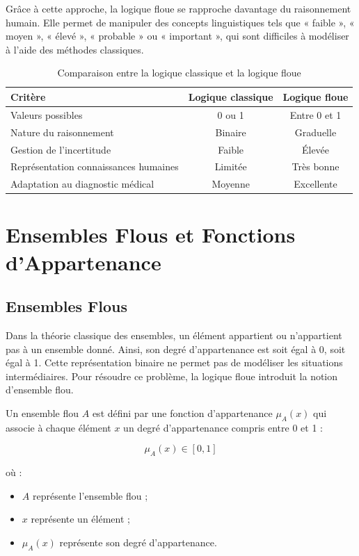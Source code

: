 \documentclass[a4paper,12pt]{report} %
\begin{document}
Grâce à cette approche, la logique floue se rapproche davantage du raisonnement humain. Elle permet de manipuler des concepts linguistiques tels que « faible », « moyen », « élevé », « probable » ou « important », qui sont difficiles à modéliser à l'aide des méthodes classiques.

\begin{table}[H]
\centering
\caption{Comparaison entre la logique classique et la logique floue}
\begin{tabular}{|l|c|c|}
\hline
\textbf{Critère} & \textbf{Logique classique} & \textbf{Logique floue} \\
\hline
Valeurs possibles & 0 ou 1 & Entre 0 et 1 \\
Nature du raisonnement & Binaire & Graduelle \\
Gestion de l'incertitude & Faible & Élevée \\
Représentation connaissances humaines & Limitée & Très bonne \\
Adaptation au diagnostic médical & Moyenne & Excellente \\
\hline
\end{tabular}
\end{table}

\section{Ensembles Flous et Fonctions d'Appartenance}

\subsection{Ensembles Flous}

Dans la théorie classique des ensembles, un élément appartient ou n'appartient pas à un ensemble donné. Ainsi, son degré d'appartenance est soit égal à 0, soit égal à 1. Cette représentation binaire ne permet pas de modéliser les situations intermédiaires. Pour résoudre ce problème, la logique floue introduit la notion d'ensemble flou.

Un ensemble flou \( A \) est défini par une fonction d'appartenance \( \mu_A(x) \) qui associe à chaque élément \( x \) un degré d'appartenance compris entre 0 et 1 :

\[
\mu_A(x) \in [0, 1]
\]

où :
\begin{itemize}
\item \( A \) représente l'ensemble flou ;
\item \( x \) représente un élément ;
\item \( \mu_A(x) \) représente son degré d'appartenance.
\end{itemize}
\end{document}
